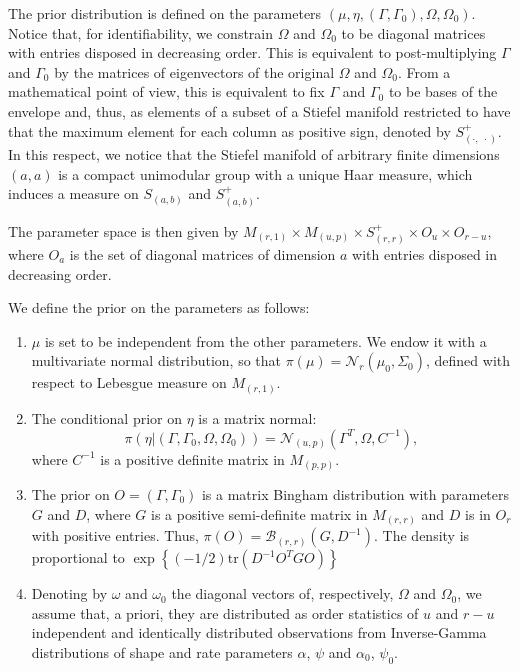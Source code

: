 \documentclass[graybox]{svmult}
\begin{document}
The prior distribution is defined on the parameters
$\left( \mu, \eta, \left(\Gamma, \Gamma_0\right), \Omega, \Omega_0
\right)$. Notice that, for identifiability, we constrain $\Omega$ and
$\Omega_0$ to be diagonal matrices with entries disposed in decreasing
order. This is equivalent to post-multiplying $\Gamma$ and $\Gamma_0$
by the matrices of eigenvectors of the original $\Omega$ and
$\Omega_0$. From a mathematical point of view, this is equivalent to
fix $\Gamma$ and $\Gamma_0$ to be bases of the envelope and, thus, as
elements of a subset of a Stiefel manifold restricted to have that the
maximum element for each column as positive sign, denoted by
$S^+_{\left( \cdot,\; \cdot \right)}$. In this respect, we notice that
the Stiefel manifold of arbitrary finite dimensions
$\left( a, a \right)$ is a compact unimodular group with a unique Haar
measure, which induces a measure on $S_{\left( a, b\right)}$ and
$S^+_{\left( a, b \right)}$.

The parameter space is then given by
$M_{\left( r, 1 \right)} \times M_{\left( u, p \right)}\times
S^+_{\left( r, r \right)} \times O_u \times O_{r -u} $, where $O_a$ is
the set of diagonal matrices of dimension $a$ with entries disposed in
decreasing order.

We define the prior on the parameters as follows:

\begin{enumerate}
\item $\mu$ is set to be independent from the other parameters. We endow it with a multivariate normal distribution, so that $\pi \left( \mu \right) = \mathcal{N}_r \left( \mu_0, \Sigma_0 \right)$, defined with respect to Lebesgue measure on $M_{\left( r, 1 \right)}$.
\item The conditional prior on $\eta$ is a matrix normal: $$\pi \left( \eta | \left( \Gamma, \Gamma_0, \Omega, \Omega_0 \right) \right) = \mathcal{N}_{\left( u, p \right)}\left( \Gamma^T, \Omega, C^{-1} \right),$$ where $C^{-1}$ is a positive definite matrix in $M_{\left( p, p \right)}$.
\item The prior on $O = \left( \Gamma, \Gamma_0 \right)$ is a matrix Bingham distribution with parameters $G$ and $D$, where $G$ is a positive semi-definite matrix in $M_{\left( r, r \right)}$ and $D$ is in $O_r$ with positive entries. Thus, $\pi \left( O \right) = \mathcal{B}_{\left( r, r \right)}\left( G, D^{-1} \right)$. The density is proportional to $\exp{\left\{ \left(-1/2\right) \mathrm{tr}\left( D^{-1}O^TGO\right) \right\}}$
\item Denoting by $\omega$ and $\omega_0$ the diagonal vectors of, respectively, $\Omega$ and $\Omega_0$, we assume that, a priori, they are distributed as order statistics of $u$ and $r - u$ independent and identically distributed observations from Inverse-Gamma distributions of shape and rate parameters $\alpha$, $\psi$ and $\alpha_0$, $\psi_0$.
\end{enumerate}
\end{document}
